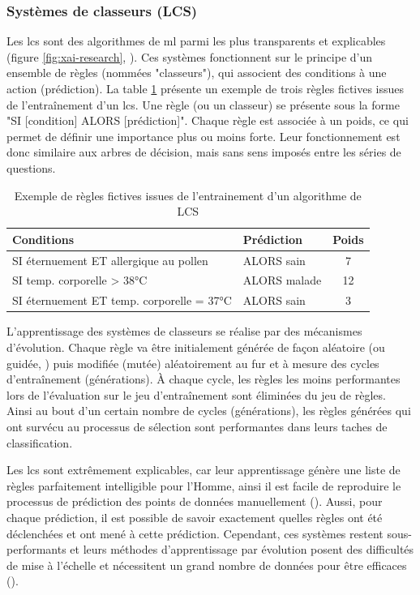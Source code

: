 \subsubsection{Systèmes de classeurs (LCS)}
Les \gls{lcs} sont des algorithmes de \gls{ml} parmi les plus transparents et explicables (figure \ref{fig:xai-research}, \cite{arrieta_explainable_2019}). Ces systèmes fonctionnent sur le principe d'un ensemble de règles (nommées "classeurs"), qui associent des conditions à une action (prédiction). La table \ref{table:lcs-rules} présente un exemple de trois règles fictives issues de l'entraînement d'un \gls{lcs}. Une règle (ou un classeur) se présente sous la forme "SI [condition] ALORS [prédiction]". Chaque règle est associée à un poids, ce qui permet de définir une importance plus ou moins forte. Leur fonctionnement est donc similaire aux arbres de décision, mais sans sens imposés entre les séries de questions.
\begin{table}[!ht]
\centering
\begin{tabular}{|l|l|c|} 
 \hline
 Conditions & Prédiction & Poids \\
 \hline
 SI éternuement ET allergique au pollen & ALORS sain & 7 \\ 
 SI temp. corporelle > 38°C & ALORS malade & 12  \\ 
 SI éternuement ET temp. corporelle = 37°C & ALORS sain & 3  \\ 

 \hline
\end{tabular}
\caption{Exemple de règles fictives issues de l'entrainement d'un algorithme de LCS}
\label{table:lcs-rules}
\end{table}

L'apprentissage des systèmes de classeurs se réalise par des mécanismes d'évolution. Chaque règle va être initialement générée de façon aléatoire (ou guidée, \cite{urbanowicz_relief-based_2018}) puis modifiée (mutée) aléatoirement au fur et à mesure des cycles d'entraînement (générations). À chaque cycle, les règles les moins performantes lors de l'évaluation sur le jeu d'entraînement sont éliminées du jeu de règles. Ainsi au bout d'un certain nombre de cycles (générations), les règles générées qui ont survécu au processus de sélection sont performantes dans leurs taches de classification.

Les \gls{lcs} sont extrêmement explicables, car leur apprentissage génère une liste de règles parfaitement intelligible pour l'Homme, ainsi il est facile de reproduire le processus de prédiction des points de données manuellement (\cite{arrieta_explainable_2019}). Aussi, pour chaque prédiction, il est possible de savoir exactement quelles règles ont été déclenchées et ont mené à cette prédiction. Cependant, ces systèmes restent sous-performants et leurs méthodes d'apprentissage par évolution posent des difficultés de mise à l'échelle et nécessitent un grand nombre de données pour être efficaces (\cite{urbanowicz_exstracs_2015}).

